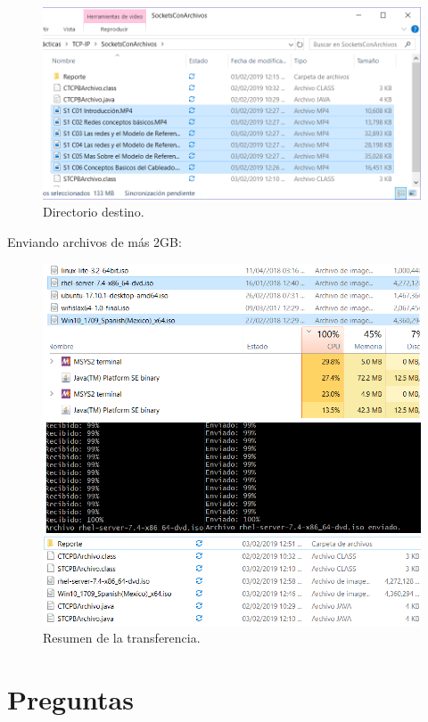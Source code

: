 \documentclass[12pt,twoside]{article}
\begin{document}
\begin{figure}[h]
	\centering
	\includegraphics[width=1\textwidth]{img/ArchivosRecibidos.png}
	\caption{Directorio destino.}
\end{figure}

\newpage

Enviando archivos de m\'as 2GB:

\begin{figure}[h]
	\centering
	\includegraphics[width=1\textwidth]{img/CS1.png}
	\caption{Resumen de la transferencia.}
\end{figure}

\newpage
		
\section{Preguntas}
\end{document}
